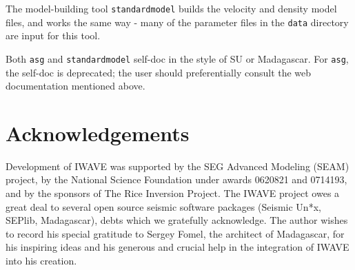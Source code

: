 The model-building tool {\tt standardmodel} builds the velocity and
density model files, and works the same way - many of the parameter
files in the {\tt data} directory are input for this tool.

Both {\tt asg} and {\tt standardmodel} self-doc in the style of SU or
Madagascar. For {\tt asg}, the self-doc is deprecated; the user should
preferentially consult the web documentation mentioned above.

\section{Acknowledgements}
Development of IWAVE was supported by the SEG Advanced Modeling (SEAM)
project, by the National Science Foundation under awards 0620821 and
0714193, and by the sponsors of The Rice Inversion Project. The IWAVE
project owes a great deal to several open source seismic software
packages (Seismic Un*x, SEPlib, Madagascar), debts which we gratefully
acknowledge. The author wishes to record his special gratitude to
Sergey Fomel, the architect of Madagascar, for his inspiring ideas and
his generous and crucial help in the integration of IWAVE into his
creation.






